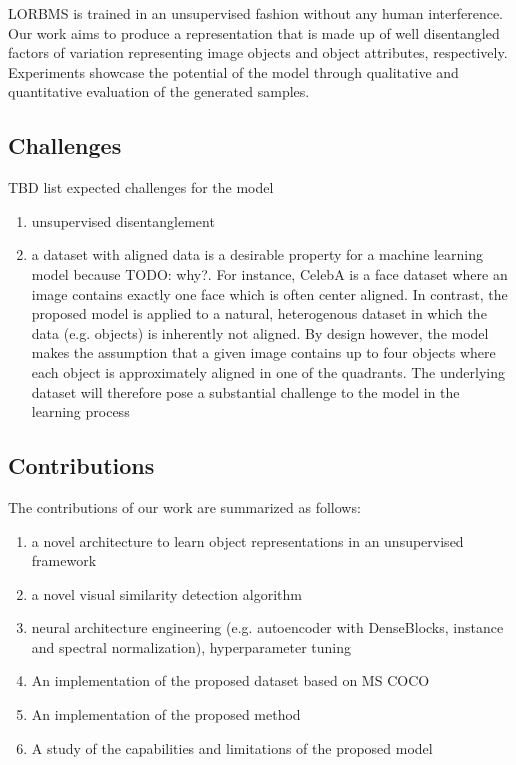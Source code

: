 \documentclass[12pt,a4paper]{article}
\begin{document}
LORBMS is trained in an unsupervised fashion without any human interference. Our work aims to produce a representation that is made up of well disentangled factors of variation representing image objects and object attributes, respectively. Experiments showcase the potential of the model through qualitative and quantitative evaluation of the generated samples.


\subsection{Challenges}
TBD list expected challenges for the model
\begin{enumerate}
  \item unsupervised disentanglement
  \item a dataset with aligned data is a desirable property for a machine learning model because TODO: why?. For instance, CelebA is a face dataset where an image contains exactly one face which is often center aligned. In contrast, the proposed model is applied to a natural, heterogenous dataset in which the data (e.g. objects) is inherently not aligned. By design however, the model makes the assumption that a given image contains up to four objects where each object is approximately aligned in one of the quadrants. The underlying dataset will therefore pose a substantial challenge to the model in the learning process
\end{enumerate}

\subsection{Contributions}
The contributions of our work are summarized as follows:
\begin{enumerate}
  \item a novel architecture to learn object representations in an unsupervised framework
  \item a novel visual similarity detection algorithm
  \item neural architecture engineering (e.g. autoencoder with DenseBlocks, instance and spectral normalization), hyperparameter tuning
  \item An implementation of the proposed dataset based on MS COCO
  \item An implementation of the proposed method
  \item A study of the capabilities and limitations of the proposed model
\end{enumerate}
\end{document}
